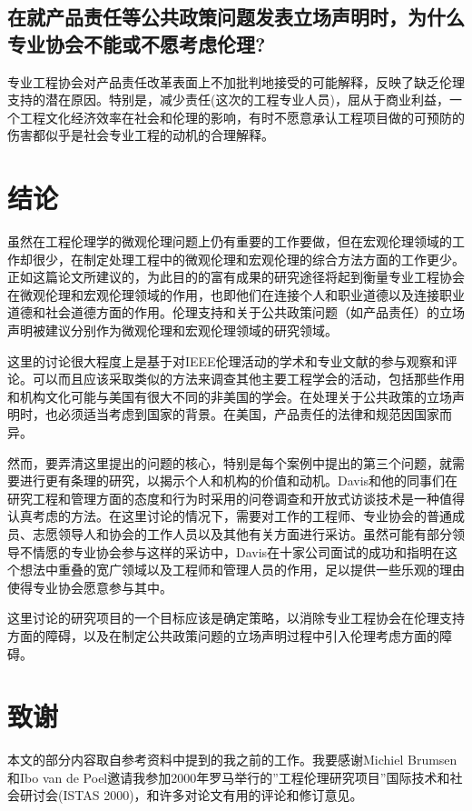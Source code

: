 \documentclass[lang=cn,11pt,a4paper]{elegantpaper}
\begin{document}
\subsection{在就产品责任等公共政策问题发表立场声明时，为什么专业协会不能或不愿考虑伦理?}
专业工程协会对产品责任改革表面上不加批判地接受的可能解释，反映了缺乏伦理支持的潜在原因。特别是，减少责任(这次的工程专业人员)，屈从于商业利益，一个工程文化经济效率在社会和伦理的影响，有时不愿意承认工程项目做的可预防的伤害都似乎是社会专业工程的动机的合理解释。

\section{结论}
虽然在工程伦理学的微观伦理问题上仍有重要的工作要做，但在宏观伦理领域的工作却很少，在制定处理工程中的微观伦理和宏观伦理的综合方法方面的工作更少。正如这篇论文所建议的，为此目的的富有成果的研究途径将起到衡量专业工程协会在微观伦理和宏观伦理领域的作用，也即他们在连接个人和职业道德以及连接职业道德和社会道德方面的作用。伦理支持和关于公共政策问题（如产品责任）的立场声明被建议分别作为微观伦理和宏观伦理领域的研究领域。

这里的讨论很大程度上是基于对IEEE伦理活动的学术和专业文献的参与观察和评论。可以而且应该采取类似的方法来调查其他主要工程学会的活动，包括那些作用和机构文化可能与美国有很大不同的非美国的学会。在处理关于公共政策的立场声明时，也必须适当考虑到国家的背景。在美国，产品责任的法律和规范因国家而异。

然而，要弄清这里提出的问题的核心，特别是每个案例中提出的第三个问题，就需要进行更有条理的研究，以揭示个人和机构的价值和动机。Davis\cite{14}和他的同事们在研究工程和管理方面的态度和行为时采用的问卷调查和开放式访谈技术是一种值得认真考虑的方法。在这里讨论的情况下，需要对工作的工程师、专业协会的普通成员、志愿领导人和协会的工作人员以及其他有关方面进行采访。虽然可能有部分领导不情愿的专业协会参与这样的采访中，Davis在十家公司面试的成功和指明在这个想法中重叠的宽广领域以及工程师和管理人员的作用，足以提供一些乐观的理由使得专业协会愿意参与其中。

这里讨论的研究项目的一个目标应该是确定策略，以消除专业工程协会在伦理支持方面的障碍，以及在制定公共政策问题的立场声明过程中引入伦理考虑方面的障碍。

\section{致谢}
本文的部分内容取自参考资料中提到的我之前的工作。我要感谢Michiel Brumsen和Ibo van de Poel邀请我参加2000年罗马举行的”工程伦理研究项目”国际技术和社会研讨会(ISTAS 2000)，和许多对论文有用的评论和修订意见。

\nocite{*}

\end{document}
